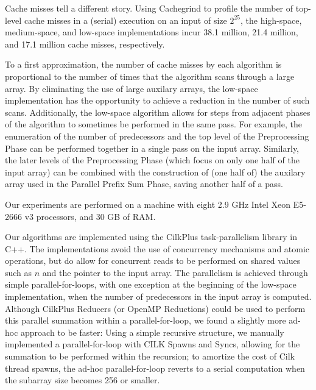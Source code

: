 \documentclass[sigplan, twocolumn]{amsart}
\renewcommand{\paragraph}[1]{\vspace{0.09in}\noindent{\bf \boldmath #1.}}
\theoremstyle{remark}
\theoremstyle{remark}
\begin{document}
Cache misses tell a different story. Using Cachegrind to profile the
number of top-level cache misses in a (serial) execution on an input
of size $2^{25}$, the high-space, medium-space, and low-space
implementations incur 38.1 million, 21.4 million, and 17.1 million
cache misses, respectively.

To a first approximation, the number of cache misses by each algorithm
is proportional to the number of times that the algorithm scans
through a large array. By eliminating the use of large auxilary
arrays, the low-space implementation has the opportunity to achieve a
reduction in the number of such scans. Additionally, the low-space
algorithm allows for steps from adjacent phases of the algorithm to
sometimes be performed in the same pass. For example, the enumeration
of the number of predecessors and the top level of the Preprocessing
Phase can be performed together in a single pass on the input
array. Similarly, the later levels of the Preprocessing Phase (which
focus on only one half of the input array) can be combined with the
construction of (one half of) the auxilary array used in the Parallel
Prefix Sum Phase, saving another half of a pass.

\paragraph{Machine and Implementation Details}
Our experiments are performed on a machine with eight 2.9 GHz Intel
Xeon E5-2666 v3 processors, and 30 GB of RAM.

Our algorithms are implemented using the CilkPlus task-parallelism
library in C++. The implementations avoid the use of concurrency
mechanisms and atomic operations, but do allow for concurrent reads to
be performed on shared values such as $n$ and the pointer to the input
array. The parallelism is achieved through simple parallel-for-loops,
with one exception at the beginning of the low-space implementation,
when the number of predecessors in the input array is
computed. Although CilkPlus Reducers (or OpenMP Reductions) could be
used to perform this parallel summation within a parallel-for-loop, we
found a slightly more ad-hoc approach to be faster: Using a simple
recursive structure, we manually implemented a parallel-for-loop with
CILK Spawns and Syncs, allowing for the summation to be performed
within the recursion; to amortize the cost of Cilk thread spawns, the
ad-hoc parallel-for-loop reverts to a serial computation when the
subarray size becomes 256 or smaller.
\end{document}

